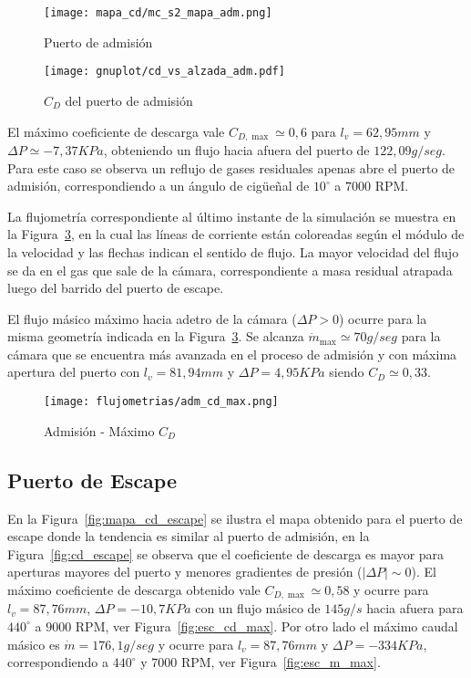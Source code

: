 \begin{figure}[h]
    \centering
    \texttt{[image: mapa\_cd/mc\_s2\_mapa\_adm.png]}
    \caption{Puerto de admisión}\label{fig:mapa_cd_admision}
\end{figure}

\begin{figure}[h]
    \centering
    \texttt{[image: gnuplot/cd\_vs\_alzada\_adm.pdf]}
    \caption{$C_{D}$ del puerto de admisión}\label{fig:cd_admision}
\end{figure}

El máximo coeficiente de descarga vale $C_{D,\max}\simeq 0,6$ para
$l_{v}=62,95 mm$ y $\Delta P\simeq -7,37 KPa$, obteniendo un flujo hacia afuera
del puerto de $122,09 g/seg$.
%
Para este caso se observa un reflujo de gases residuales apenas abre el puerto
de admisión, correspondiendo a un ángulo de cigüeñal de $10^{\circ}$ a $7000$
RPM.

La flujometría correspondiente al último instante de la simulación se muestra en
la Figura~\ref{fig:adm_cd_max}, en la cual las líneas de corriente están
coloreadas según el módulo de la velocidad y las flechas indican el sentido de
flujo.
%
La mayor velocidad del flujo se da en el gas que sale de la cámara,
correspondiente a masa residual atrapada luego del barrido del puerto de escape.


El flujo másico máximo hacia adetro de la cámara ($\Delta P>0$) ocurre para la
misma geometría indicada en la Figura~\ref{fig:adm_cd_max}.
%
Se alcanza $\dot{m}_{\max}\simeq 70 g/seg$ para la cámara que se encuentra más
avanzada en el proceso de admisión y con máxima apertura del puerto con
$l_{v}=81,94 mm$ y $\Delta P=4,95 KPa$ siendo $C_{D}\simeq 0,33$.

\begin{figure}[h]
    \centering
    \texttt{[image: flujometrias/adm\_cd\_max.png]}
    \caption{Admisión - Máximo $C_{D}$}\label{fig:adm_cd_max}
\end{figure}


\subsection{Puerto de Escape}
%
En la Figura~\ref{fig:mapa_cd_escape} se ilustra el mapa obtenido para el puerto
de escape donde la tendencia es similar al puerto de admisión, en la
Figura~\ref{fig:cd_escape} se observa que el coeficiente de descarga es mayor
para aperturas mayores del puerto y menores gradientes de presión
($|\Delta P|\sim 0$).
%
El máximo coeficiente de descarga obtenido vale $C_{D,\max}\simeq 0,58$ y ocurre
para $l_{v}=87,76 mm$, $\Delta P=-10,7 KPa$ con un flujo másico de $145 g/s$
hacia afuera para $440^{\circ}$ a $9000$ RPM, ver Figura~\ref{fig:esc_cd_max}.
%
Por otro lado el máximo caudal másico es $\dot{m}=176,1 g/seg$ y ocurre para
$l_{v}=87,76 mm$ y $\Delta P=-334 KPa$, correspondiendo a $440^{\circ}$ y 7000
RPM, ver Figura~\ref{fig:esc_m_max}.

